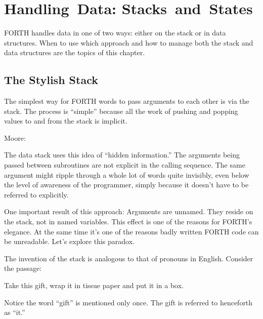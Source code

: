 

\chapter{Handling~Data: Stacks~and~States}

FORTH handles data in one of two ways: either on the stack or in data
structures. When to use which approach and how to manage both the
stack and data structures are the topics of this chapter.

\section{The Stylish Stack}

The simplest way for FORTH words to pass arguments to each other is
via the stack. The process is ``simple'' because all the work of pushing
and popping values to and from the stack is implicit.

\begin{interview}
Moore:

\begin{tfquot}
The data stack uses this idea of ``hidden information.'' The arguments
being passed between subroutines are not explicit in the calling sequence.
The same argument might ripple through a whole lot of words quite invisibly,
even below the level of awareness of the programmer, simply because it
doesn't have to be referred to explicitly.
\end{tfquot}
\end{interview}

One important result of this approach: Arguments are unnamed. They
reside on the stack, not in named variables. This effect is one of the
reasons for FORTH's elegance. At the same time it's one of the reasons
badly written FORTH code can be unreadable. Let's explore this
paradox.

The invention of the stack is analogous to that of pronouns in
English. Consider the passage:

\begin{tfquot}
Take this gift, wrap it in tissue paper and put it in a box.
\end{tfquot}
Notice the word ``gift'' is mentioned only once. The gift is referred to
henceforth as ``it.''

